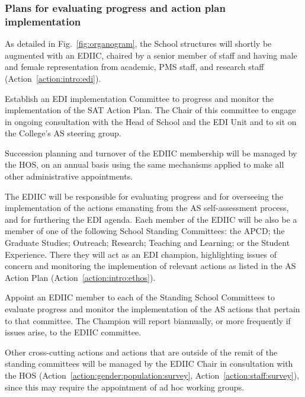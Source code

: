 \subsubsection{Plans for evaluating progress and action plan implementation}

As detailed in Fig.~\ref{fig:organogram}, the School structures will shortly be augmented with an \ac{EDIIC}, chaired by a senior member of staff and having male and female representation from academic, \ac{PMS} staff, and research staff (Action~\ref{action:intro:edi}). 

\newcommand{\actintroedi}{Establish an EDI implementation Committee to progress and monitor the implementation of the SAT Action Plan. The Chair of this committee to engage in ongoing consultation with the Head of School and the EDI Unit and to sit on the College’s AS steering group.
}
\begin{action}[label=action:intro:edi]{}
\actintroedi
\hfill{
    \hypersetup{hidelinks}
    \hyperlink{a2}{\gotoactionsymbol{}}
}
\end{action}
Succession planning and turnover of the EDIIC membership will be managed by the \ac{HOS}, on an annual basis using the same mechanisms applied to make all other administrative appointments. 

The EDIIC will be responsible for evaluating progress and for overseeing the implementation of the actions emanating from the AS self-assessment process, and for furthering the EDI agenda. Each member of the EDIIC will be also be a member of one of the following School Standing  Committees: the \ac{APCD}; the Graduate Studies; Outreach; Research; Teaching and Learning; or the Student Experience. There they will act as an EDI champion, highlighting issues of concern and monitoring the implemention of relevant actions as listed in the AS Action Plan (Action~\ref{action:intro:ethos}). 



\newcommand{\actintroethos}{
Appoint an EDIIC member to each of the Standing School Committees to evaluate progress and monitor the implementation of the AS actions that pertain to that committee. The Champion will report biannually, or more frequently if issues arise, to the EDIIC committee.
}
\begin{action}[label=action:intro:ethos]{}
\actintroethos
\hfill{
    \hypersetup{hidelinks}
    \hyperlink{a3}{\gotoactionsymbol{}}
}
\end{action}

Other cross-cutting actions and actions that are outside of the remit of the standing committees will be managed by the EDIIC Chair in consultation with the \ac{HOS} (Action~\ref{action:gender:population:survey}, Action~\ref{action:staff:survey}), since this may require the appointment of ad hoc working groups. 


